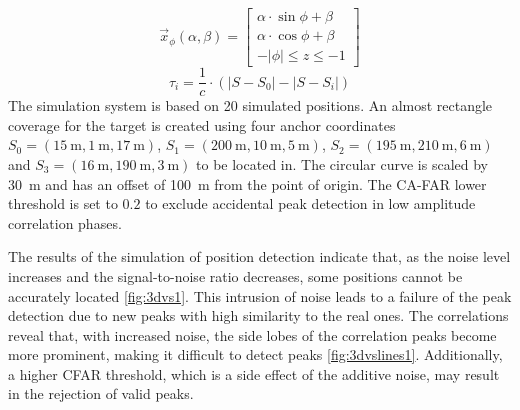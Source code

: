 \begin{equation}
	\vec{x}_{\phi}(\alpha,\beta)
	=\left[
	\begin{array}{c}
		\alpha\cdot\sin{\phi}+\beta\\
		\alpha\cdot\cos{\phi}+\beta\\
		-|\phi| \leq z \leq -1
	\end{array}
	\right]
	\label{eq:helix}
\end{equation}
\begin{equation}
	\tau_i = \frac{1}{c} \cdot \left(\left| S - S_0 \right | - \left | S - S_i \right|\right)
	\label{eq:dist2toa}
\end{equation}
The simulation system is based on 20 simulated positions. An almost rectangle coverage for the target is created using four anchor coordinates $S_0=(\SI{15}{\meter},\SI{1}{\meter},\SI{17}{\meter})$, $S_1=(\SI{200}{\meter},\SI{10}{\meter},\SI{5}{\meter})$, $S_2=(\SI{195}{\meter},\SI{210}{\meter},\SI{6}{\meter})$ and $S_3=(\SI{16}{\meter},\SI{190}{\meter},\SI{3}{\meter})$ to be located in. The circular curve is scaled by \SI{30}{\meter} and has an offset of \SI{100}{\meter} from the point of origin.  The CA-FAR lower threshold is set to $0.2$ to exclude accidental peak detection in low amplitude correlation phases.

The results of the simulation of position detection indicate that, as the noise level increases and the signal-to-noise ratio decreases, some positions cannot be accurately located \ref{fig:3dvs1}. This intrusion of noise leads to a failure of the peak detection due to new peaks with high similarity to the real ones. The correlations reveal that, with increased noise, the side lobes of the correlation peaks become more prominent, making it difficult to detect peaks \ref{fig:3dvslines1}. Additionally, a higher CFAR threshold, which is a side effect of the additive noise, may result in the rejection of valid peaks.

